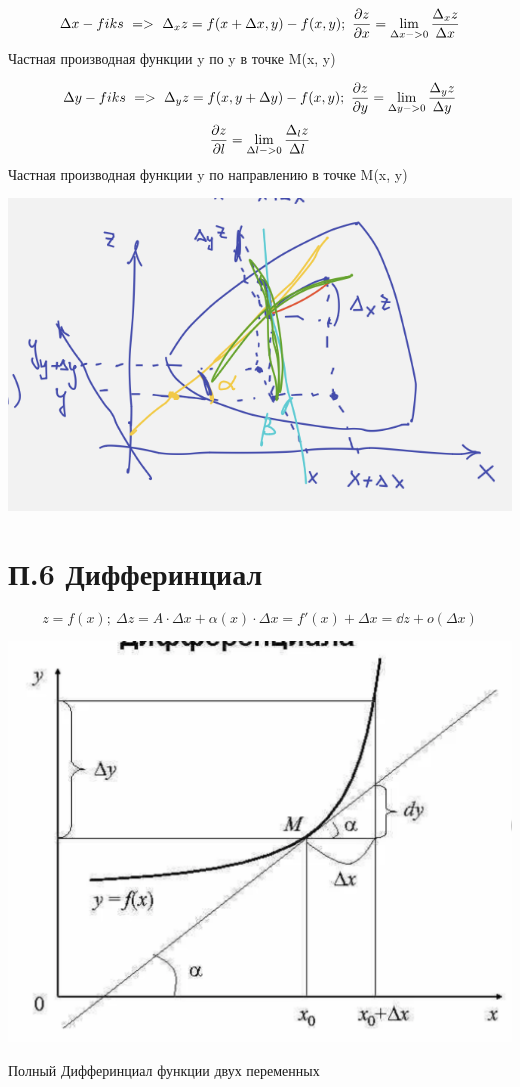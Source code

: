 \documentclass{article}
\begin{document}
\begin{equation*}
    \Delta x - fiks\ => \ \Delta_x z = f(x +\Delta x, y) - f(x, y);\ \pdv{z}{x} = \lim_{\Delta x -> 0 }   \frac{\Delta_x z}{\Delta x}
\end{equation*}
Частная производная функции y по y в точке M(x, y)

\begin{equation*}
    \Delta y - fiks\ => \ \Delta_y z = f(x, y +\Delta y) - f(x, y);\ \pdv{z}{y} = \lim_{\Delta y -> 0 }   \frac{\Delta_y z}{\Delta y}
\end{equation*}
\begin{equation*}
    \pdv{z}{l} = \lim_{\Delta l -> 0 }   \frac{\Delta_l z}{\Delta l}
\end{equation*}
Частная производная функции y по направлению в точке M(x, y)
\begin{center}
    \includegraphics[width=.3\textwidth]{f(x,y).png} 
\end{center}

\section{П.6 Дифферинциал}


\begin{equation*}
    z = f(x);\ \Delta z =A \cdot \Delta x + \alpha(x)\cdot \Delta x = f'(x) + \Delta x = \dd z +o(\Delta x)
\end{equation*}
\begin{center}
    \includegraphics[width=.3\textwidth]{dx} 
\end{center}

Полный Дифферинциал функции двух переменных
\end{document}
